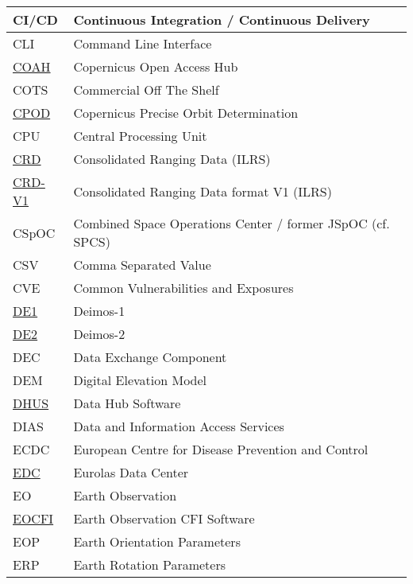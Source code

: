 \documentclass[dec_sum_main.tex]{subfiles}
\begin{document}
\begin{longtable}{|m{2.8cm}|m{10cm}|}
	CI/CD & Continuous Integration / Continuous Delivery \\ \hline
    CLI & Command Line Interface \\ \hline
    \href{https://scihub.copernicus.eu/}{COAH} & Copernicus Open Access Hub \\ \hline
	COTS & Commercial Off The Shelf \\ \hline
    \href{https://sentinels.copernicus.eu/web/sentinel/technical-guides/sentinel-1-sar/pod/products-requirements}{CPOD}  & Copernicus Precise Orbit Determination \\ \hline
	CPU & Central Processing Unit \\ \hline
	\href{https://ilrs.gsfc.nasa.gov/data_and_products/formats/crd.html}{CRD} & Consolidated Ranging Data (ILRS) \\ \hline
	\href{https://ilrs.gsfc.nasa.gov/docs/2009/crd_v1.01.pdf}{CRD-V1} & Consolidated Ranging Data format V1 (ILRS) \\ \hline
	CSpOC & Combined Space Operations Center /  former JSpOC (cf. SPCS) \\ \hline
    CSV & Comma Separated Value \\ \hline
    CVE & Common Vulnerabilities and Exposures\\ \hline
    \href{https://directory.eoportal.org/web/eoportal/satellite-missions/d/deimos-1}{DE1} & Deimos-1 \\ \hline	
    \href{https://directory.eoportal.org/web/eoportal/satellite-missions/d/deimos-2}{DE2} & Deimos-2 \\ \hline
	DEC & Data Exchange Component \\ \hline
    DEM & Digital Elevation Model \\ \hline
	\href{https://sentineldatahub.github.io/DataHubSystem/}{DHUS} & Data Hub Software \\ \hline
	DIAS & Data and Information Access Services \\ \hline
	ECDC & European Centre for Disease Prevention and Control \\ \hline
	\href{https://edc.dgfi.tum.de/en/}{EDC} & Eurolas Data Center \\ \hline
	EO & Earth Observation \\ \hline
	\href{https://eop-cfi.esa.int/index.php/mission-cfi-software/eocfi-software}{EOCFI} & Earth Observation CFI Software \\ \hline
	EOP & Earth Orientation Parameters \\ \hline
    ERP & Earth Rotation Parameters \\ \hline

\end{longtable}
\end{document}
